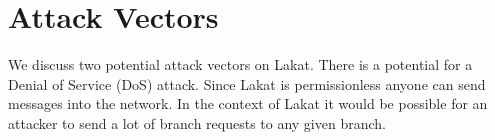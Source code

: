 \section{Attack Vectors}
\label{sc:attackvectors}

We discuss two potential attack vectors on Lakat. There is a potential for a Denial of Service (DoS) attack. Since Lakat is permissionless anyone can send messages into the network. In the context of Lakat it would be possible for an attacker to send a lot of branch requests to any given branch. 